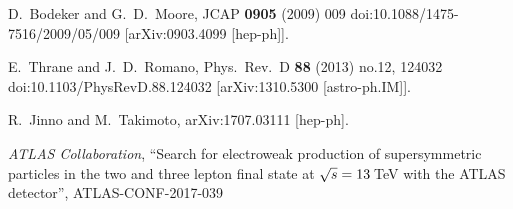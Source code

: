 \documentclass[12pt]{article}
\begin{document}
\begin{thebibliography}{99}
  D.~Bodeker and G.~D.~Moore,
  JCAP {\bf 0905} (2009) 009
  doi:10.1088/1475-7516/2009/05/009
  [arXiv:0903.4099 [hep-ph]].

  
  E.~Thrane and J.~D.~Romano,
  Phys.\ Rev.\ D {\bf 88} (2013) no.12,  124032
  doi:10.1103/PhysRevD.88.124032
  [arXiv:1310.5300 [astro-ph.IM]].


  R.~Jinno and M.~Takimoto,
  arXiv:1707.03111 [hep-ph].

  
  {\it ATLAS Collaboration}, 
  ``Search for electroweak production of supersymmetric particles in
  the two and three lepton final state at
  $\boldmath{\sqrt{s}=13\,}$TeV with the ATLAS detector'', ATLAS-CONF-2017-039
  

\end{thebibliography}
\end{document}
